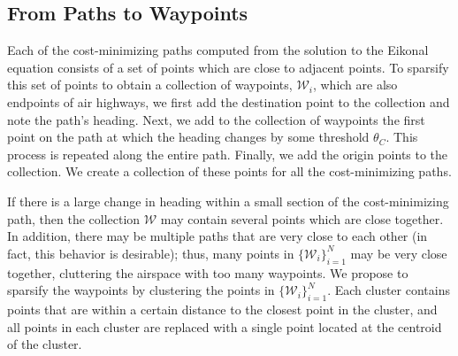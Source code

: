 \subsection{From Paths to Waypoints}
Each of the cost-minimizing paths computed from the solution to the Eikonal equation consists of a set of points which are close to adjacent points. To sparsify this set of points to obtain a collection of waypoints, $\mathcal{W}_i$, which are also endpoints of air highways, we first add the destination point to the collection and note the path's heading. Next, we add to the collection of waypoints the first point on the path at which the heading changes by some threshold $\theta_C$. This process is repeated along the entire path. Finally, we add the origin points to the collection. We create a collection of these points for all the cost-minimizing paths.

If there is a large change in heading within a small section of the cost-minimizing path, then the collection $\mathcal{W}$ may contain several points which are close together. In addition, there may be multiple paths that are very close to each other (in fact, this behavior is desirable); thus, many points in $\{\mathcal{W}_i\}_{i=1}^N$ may be very close together, cluttering the airspace with too many waypoints. We propose to sparsify the waypoints by clustering the points in $\{\mathcal{W}_i\}_{i=1}^N$. Each cluster contains points that are within a certain distance to the closest point in the cluster, and all points in each cluster are replaced with a single point located at the centroid of the cluster.